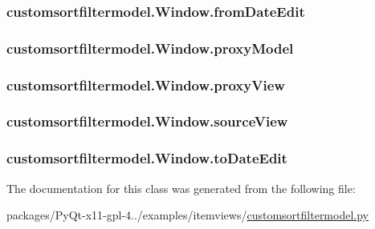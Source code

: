 \subsubsection[{from\+Date\+Edit}]{\setlength{\rightskip}{0pt plus 5cm}customsortfiltermodel.\+Window.\+from\+Date\+Edit}\label{classcustomsortfiltermodel_1_1Window_a796d1ded16f538f721945be3a52954b2}
\hypertarget{classcustomsortfiltermodel_1_1Window_a702544e482fdf80329994a1430d71762}{}
\subsubsection[{proxy\+Model}]{\setlength{\rightskip}{0pt plus 5cm}customsortfiltermodel.\+Window.\+proxy\+Model}\label{classcustomsortfiltermodel_1_1Window_a702544e482fdf80329994a1430d71762}
\hypertarget{classcustomsortfiltermodel_1_1Window_a0f4aae0703555ddb351227b9305b3099}{}
\subsubsection[{proxy\+View}]{\setlength{\rightskip}{0pt plus 5cm}customsortfiltermodel.\+Window.\+proxy\+View}\label{classcustomsortfiltermodel_1_1Window_a0f4aae0703555ddb351227b9305b3099}
\hypertarget{classcustomsortfiltermodel_1_1Window_ab2a2b1e24976fa31194b5d5d3f7116e7}{}
\subsubsection[{source\+View}]{\setlength{\rightskip}{0pt plus 5cm}customsortfiltermodel.\+Window.\+source\+View}\label{classcustomsortfiltermodel_1_1Window_ab2a2b1e24976fa31194b5d5d3f7116e7}
\hypertarget{classcustomsortfiltermodel_1_1Window_af7b5a199fe9b1a9819aa976b1c67ee4e}{}
\subsubsection[{to\+Date\+Edit}]{\setlength{\rightskip}{0pt plus 5cm}customsortfiltermodel.\+Window.\+to\+Date\+Edit}\label{classcustomsortfiltermodel_1_1Window_af7b5a199fe9b1a9819aa976b1c67ee4e}


The documentation for this class was generated from the following file\+:\begin{DoxyCompactItemize}
\item 
packages/\+Py\+Qt-\/x11-\/gpl-\/4../examples/itemviews/\hyperlink{customsortfiltermodel_8py}{customsortfiltermodel.\+py}\end{DoxyCompactItemize}

